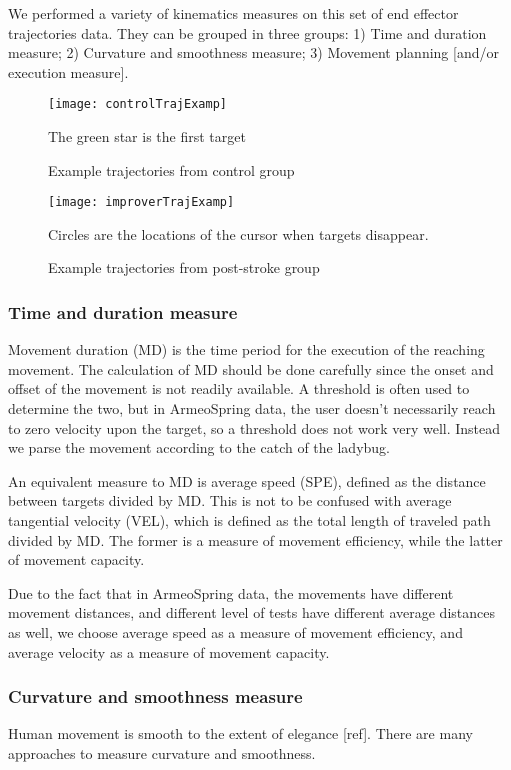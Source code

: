 We performed a variety of kinematics measures on this set of end effector trajectories data. 
They can be grouped in three groups: 1) Time and duration measure; 2) Curvature and smoothness measure; 3) Movement planning [and/or execution measure]. 



\begin{figure}
	\texttt{[image: controlTrajExamp]}
	\centering
	\caption{Example trajectories from control group}
	\medskip
	\small The green star is the first target
	\label{fig:controlTrajExamp}
\end{figure}

\begin{figure}
	\texttt{[image: improverTrajExamp]}
	\centering
	\caption{Example trajectories from post-stroke group}
	\medskip
	\small Circles are the locations of the cursor when targets disappear.
	\label{fig:improverTrajExamp}
\end{figure}

\subsubsection{Time and duration measure}
Movement duration (MD) is the time period for the execution of the reaching movement. 
The calculation of MD should be done carefully since the onset and offset of the movement is not readily available. 
A threshold is often used to determine the two, but in ArmeoSpring data, the user doesn't necessarily reach to zero velocity upon the target, so a threshold does not work very well. 
Instead we parse the movement according to the catch of the ladybug. 

An equivalent measure to MD is average speed (SPE), defined as the distance between targets divided by MD. 
This is not to be confused with average tangential velocity (VEL), which is defined as the total length of traveled path divided by MD. 
The former is a measure of movement efficiency, while the latter of movement capacity. 

Due to the fact that in ArmeoSpring data, the movements have different movement distances, and different level of tests have different average distances as well, we choose average speed as a measure of movement efficiency, and average velocity as a measure of movement capacity. 

\subsubsection{Curvature and smoothness measure}
Human movement is smooth to the extent of elegance [ref]. 
There are many approaches to measure curvature and smoothness.

